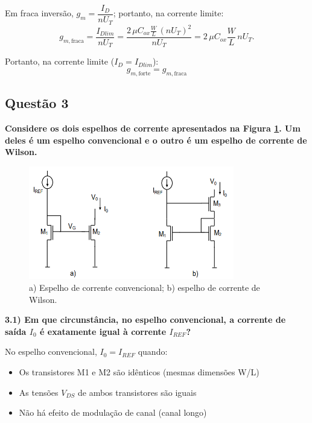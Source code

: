 ﻿\documentclass[12pt,a4paper]{article}
\begin{document}
Em fraca inversão, $g_m=\dfrac{I_D}{nU_T}$; portanto, na corrente limite:
\begin{equation*}
g_{m,\text{fraca}}=\frac{I_{Dlim}}{nU_T}
=\frac{2\,\mu C_{ox}\frac{W}{L}\,(nU_T)^2}{nU_T}
=2\,\mu C_{ox}\frac{W}{L}\,nU_T.
\end{equation*}

Portanto, na corrente limite ($I_D=I_{Dlim}$):
\begin{equation}
\boxed{g_{m,\text{forte}} = g_{m,\text{fraca}}}
\end{equation}

\subsection*{Questão 3}
	\textbf{Considere os dois espelhos de corrente apresentados na Figura \ref{fig:espelhos_corrente}. Um deles é um espelho convencional e o outro é um espelho de corrente de Wilson.}

\begin{figure}[H]
    \centering
    \includegraphics[width=0.8\textwidth]{espelho_a_b.png}
    \caption{a) Espelho de corrente convencional; b) espelho de corrente de Wilson.}
    \label{fig:espelhos_corrente}
\end{figure}
\textbf{3.1) Em que circunstância, no espelho convencional, a corrente de saída $I_0$ é exatamente igual à corrente $I_{REF}$?}

No espelho convencional, $I_0 = I_{REF}$ quando:
\begin{itemize}
    \item Os transistores M1 e M2 são idênticos (mesmas dimensões W/L)
    \item As tensões $V_{DS}$ de ambos transistores são iguais
    \item Não há efeito de modulação de canal (canal longo)
\end{itemize}
\end{document}
